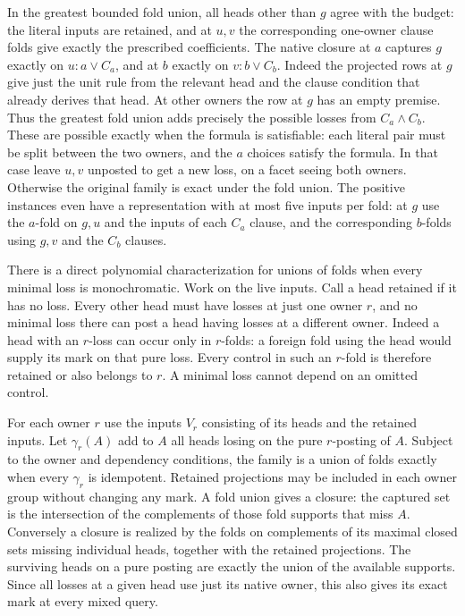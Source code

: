 In the greatest bounded fold union, all heads other than
$g$ agree with the budget: the literal inputs are retained,
and at $u,v$ the corresponding one-owner clause folds give
exactly the prescribed coefficients. The native closure at
$a$ captures $g$ exactly on $u:a\lor C_a$, and at $b$ exactly
on $v:b\lor C_b$. Indeed the projected rows at $g$ give
just the unit rule from the relevant head and the clause
condition that already derives that head. At other owners
the row at $g$ has an empty premise. Thus the greatest fold
union adds precisely the possible losses from $C_a\land C_b$.
These are possible exactly when the formula is satisfiable:
each literal pair must be split between the two owners, and
the $a$ choices satisfy the formula. In that case leave
$u,v$ unposted to get a new loss, on a facet seeing both
owners. Otherwise the original family is exact under the
fold union. The positive instances even have a representation
with at most five inputs per fold: at $g$ use the $a$-fold
on $g,u$ and the inputs of each $C_a$ clause, and the
corresponding $b$-folds using $g,v$ and the $C_b$ clauses.

There is a direct polynomial characterization for unions of
folds when every minimal loss is monochromatic. Work on the
live inputs. Call a head retained if it has no loss. Every
other head must have losses at just one owner $r$, and no
minimal loss there can post a head having losses at a
different owner. Indeed a head with an $r$-loss can occur
only in $r$-folds: a foreign fold using the head would
supply its mark on that pure loss. Every control in such an
$r$-fold is therefore retained or also belongs to $r$.
A minimal loss cannot depend on an omitted control.

For each owner $r$ use the inputs $V_r$ consisting of its
heads and the retained inputs. Let $\gamma_r(A)$ add to
$A$ all heads losing on the pure $r$-posting of $A$.
Subject to the owner and dependency conditions, the family
is a union of folds exactly when every $\gamma_r$ is
idempotent. Retained projections may be included in each
owner group without changing any mark. A fold union gives a closure: the captured
set is the intersection of the complements of those fold
supports that miss $A$. Conversely a closure is realized
by the folds on complements of its maximal closed sets
missing individual heads, together with the retained
projections. The surviving heads on a pure posting are
exactly the union of the available supports. Since all
losses at a given head use just its native owner, this
also gives its exact mark at every mixed query.

